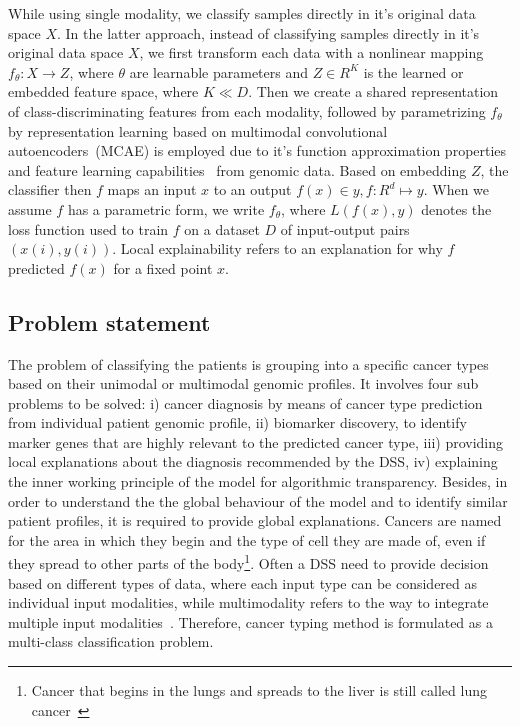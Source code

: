 \hspace*{3.5mm} While using single modality, we classify samples directly in it's original data space $X$. In the latter approach, instead of classifying samples directly in it's original data space $X$, we first transform each data with a nonlinear mapping $f_{\theta}: X \rightarrow Z$, where $\theta$ are learnable parameters and $Z \in {R}^{K}$ is the learned or embedded feature space, where $K \ll D$. Then we create a shared representation of class-discriminating features from each modality, followed by parametrizing $f_{\theta}$ by representation learning based on multimodal convolutional autoencoders~(MCAE) is employed due to it's function approximation properties and feature learning capabilities~\cite{xie2016unsupervised,karim2019drug} from genomic data. Based on embedding $Z$, the classifier then $f$ maps an input $x$ to an output $f(x) \in y, f: {R}^{d} \mapsto y$. When we assume $f$ has a parametric form, we write $f_{\theta}$, where ${L}(f(x), y)$ denotes the loss function used to train $f$ on a dataset $D$ of input-output pairs $(x(i), y(i))$. Local explainability refers to an explanation for why $f$ predicted $f(x)$ for a fixed point $x$. 
\fi 

\subsection{Problem statement} %
The problem of classifying the patients is grouping into a specific cancer types based on their unimodal or multimodal genomic profiles. It involves four sub problems to be solved: i) cancer diagnosis by means of cancer type prediction from individual patient genomic profile, ii) biomarker discovery, to identify marker genes that are highly relevant to the predicted cancer type, iii) providing local explanations about the diagnosis recommended by the DSS, iv) explaining the inner working principle of the model for algorithmic transparency. Besides, in order to understand the the global behaviour of the model and to identify similar patient profiles, it is required to provide global explanations.  
Cancers are named for the area in which they begin and the type of cell they are made of, even if they spread to other parts of the body\footnote{Cancer that begins in the lungs and spreads to the liver is still called lung cancer~\cite{19Cruz}}. Often a DSS need to provide decision based on different types of data, where each input type can be considered as individual input modalities, while multimodality refers to the way to integrate multiple input modalities~\cite{mmsurvey}. Therefore, cancer typing method is formulated as a multi-class classification problem. 

